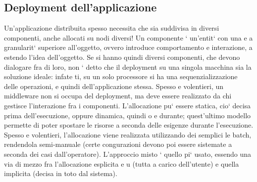 \documentclass[a4paper,12pt]{article}
\begin{document}
\subsection{Deployment dell'applicazione}

Un'applicazione distribuita spesso necessita che sia suddivisa in diversi componenti, anche allocati su nodi diversi! Un
componente ` un'entit` con una
e
a
granularit` superiore all'oggetto, ovvero introduce comportamento e interazione,
a
estendo l'idea dell'oggetto.
Se si hanno quindi diversi componenti, che devono dialogare fra di loro, non
` detto che il deployment su una singola macchina sia la soluzione ideale: infate
ti, su un solo processore si ha una sequenzializzazione delle operazioni, e quindi
dell'applicazione stessa.
Spesso e volentieri, un middleware non si occupa del deployment, ma deve
essere realizzato da chi gestisce l'interazione fra i componenti. L'allocazione
pu` essere statica, cio` decisa prima dell'esecuzione, oppure dinamica, quindi
o
e
durante; quest'ultimo modello permette di poter spostare le risorse a seconda
delle esigenze durante l'esecuzione. Spesso e volentieri, l'allocazione viene realizzata utilizzando dei semplici le
batch, rendendola semi-manuale (certe congurazioni devono poi essere sistemate a seconda dei casi dall'operatore).
L'approccio misto ` quello pi` usato, essendo una via di mezzo fra l'allocazione esplicita
e
u
(tutta a carico dell'utente) e quella implicita (decisa in toto dal sistema).
\end{document}
